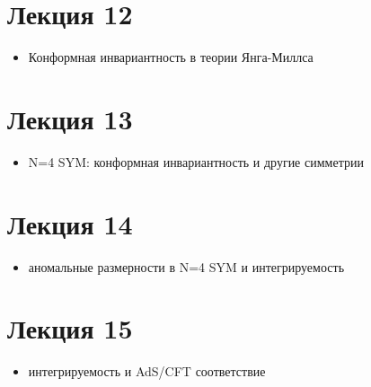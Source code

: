 \documentclass[a4paper,12pt]{article} \usepackage[utf8x]{inputenc} \usepackage[russian]{babel}
\theoremstyle{definition} \newtheorem{corollary}{Corollary}[theorem] \theoremstyle{definition}
\begin{document}
\section{Лекция 12}
  \begin{itemize}
  \item Конформная инвариантность в теории Янга-Миллса
  \end{itemize}
\section{Лекция 13}
  \begin{itemize}
  \item N=4 SYM: конформная инвариантность и другие симметрии
  \end{itemize}
\section{Лекция 14}
  \begin{itemize}
  \item аномальные размерности в N=4 SYM и интегрируемость
  \end{itemize}

\section{Лекция 15}
  \begin{itemize}
  \item интегрируемость и AdS/CFT соответствие
  \end{itemize}

{} 
\end{document}
